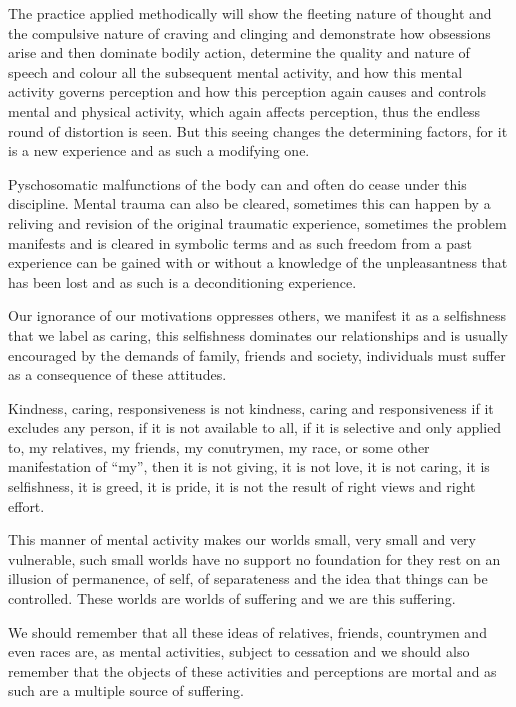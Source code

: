 \documentclass[a5paper,10pt,english]{book}
\begin{document}
\sphinxAtStartPar
The practice applied methodically will show the fleeting nature of thought and the compulsive nature of craving and clinging and demonstrate how obsessions arise and then dominate bodily action, determine the quality and nature of speech and colour all the subsequent mental activity, and how this mental activity governs perception and how this perception again causes and controls mental and physical activity, which again affects perception, thus the endless round of distortion is seen. But this seeing changes the determining factors, for it is a new experience and as such a modifying one.

\sphinxAtStartPar
Pyschosomatic malfunctions of the body can and often do cease under this discipline. Mental trauma can also be cleared, sometimes this can happen by a reliving and revision of the original traumatic experience, sometimes the problem manifests and is cleared in symbolic terms and as such freedom from a past experience can be gained with or without a knowledge of the unpleasantness that has been lost and as such is a deconditioning experience.

\sphinxAtStartPar
Our ignorance of our motivations oppresses others, we manifest it as a selfishness that we label as caring, this selfishness dominates our relationships and is usually encouraged by the demands of family, friends and society, individuals must suffer as a consequence of these attitudes.

\sphinxAtStartPar
Kindness, caring, responsiveness is not kindness, caring and responsiveness if it excludes any person, if it is not available to all, if it is selective and only applied to, my relatives, my friends, my conutrymen, my race, or some other manifestation of “my”, then it is not giving, it is not love, it is not caring, it is selfishness, it is greed, it is pride, it is not the result of right views and right effort.

\sphinxAtStartPar
This manner of mental activity makes our worlds small, very small and very vulnerable, such small worlds have no support no foundation for they rest on an illusion of permanence, of self, of separateness and the idea that things can be controlled. These worlds are worlds of suffering and we are this suffering.

\sphinxAtStartPar
We should remember that all these ideas of relatives, friends, countrymen and even races are, as mental activities, subject to cessation and we should also remember that the objects of these activities and perceptions are mortal and as such are a multiple \sphinxhyphen{}source of suffering.
\end{document}
